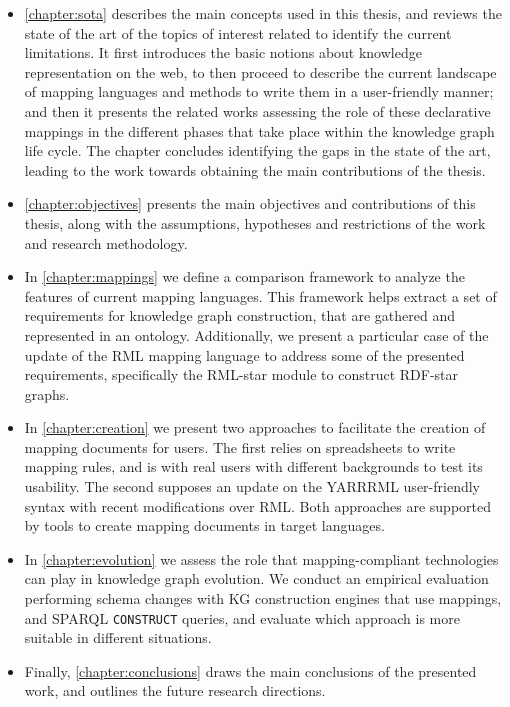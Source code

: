 \begin{itemize}
    \item \cref{chapter:sota} describes the main concepts used in this thesis, and reviews the state of the art of the topics of interest related to identify the current limitations. It first introduces the basic notions about knowledge representation on the web, to then proceed to describe the current landscape of mapping languages and methods to write them in a user-friendly manner; and then it presents the related works assessing the role of these declarative mappings in the different phases that take place within the knowledge graph life cycle. The chapter concludes identifying the gaps in the state of the art, leading to the work towards obtaining the main contributions of the thesis.
    
    \item \cref{chapter:objectives} presents the main objectives and contributions of this thesis, along with the assumptions, hypotheses and restrictions of the work and research methodology. 
    
    \item In \cref{chapter:mappings} we define a comparison framework to analyze the features of current mapping languages. This framework helps extract a set of requirements for knowledge graph construction, that are gathered and represented in an ontology. Additionally, we present a particular case of the update of the RML mapping language to address some of the presented requirements, specifically the RML-star module to construct RDF-star graphs.
    
    \item In \cref{chapter:creation} we present two approaches to facilitate the creation of mapping documents for users. The first relies on spreadsheets to write mapping rules, and is with real users with different backgrounds to test its usability. The second supposes an update on the YARRRML user-friendly syntax with recent modifications over RML. Both approaches are supported by tools to create mapping documents in target languages. 
    
    \item In \cref{chapter:evolution} we assess the role that mapping-compliant technologies can play in knowledge graph evolution. We conduct an empirical evaluation performing schema changes with KG construction engines that use mappings, and SPARQL \texttt{CONSTRUCT} queries, and evaluate which approach is more suitable in different situations. 
    
    \item Finally, \cref{chapter:conclusions} draws the main conclusions of the presented work, and outlines the future research directions. 
    
\end{itemize}


